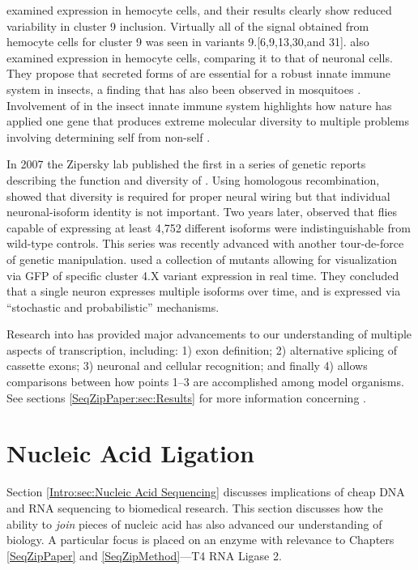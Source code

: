     \citep{Neves2004} examined \dscam{} expression in hemocyte cells, and their results clearly show reduced variability in cluster 9 inclusion. Virtually all of the signal obtained from hemocyte cells for cluster 9 was seen in variants 9.[6,9,13,30,and 31]. \citep{Watson2005} also examined \dscam{} expression in hemocyte cells, comparing it to that of neuronal cells. They propose that secreted forms of \dscam{} are essential for a robust innate immune system in insects, a finding that has also been observed in mosquitoes \citep{Dong2006}. Involvement of \dscam{} in the insect innate immune system highlights how nature has applied one gene that produces extreme molecular diversity to multiple problems involving determining self from non-self \citep{Hemani2012,Shi2012a, Hattori2008}.

    In 2007 the Zipersky lab published \citep{Hattori2007} the first in a series of genetic reports describing the function and diversity of \dscam{}. Using homologous recombination, \citet{Hattori2007} showed that \dscam{} diversity is required for proper neural wiring but that individual neuronal-isoform identity is not important. Two years later, \citet{Hattori2009} observed that flies capable of expressing at least 4,752 different \dscam{} isoforms were indistinguishable from wild-type controls. This series was recently advanced with another tour-de-force of genetic manipulation. \citet{Miura2013b} used a collection of \dscam{} mutants allowing for visualization via GFP of specific cluster 4.X variant expression in real time. They concluded that a single neuron expresses multiple \dscam{} isoforms over time, and \dscam{} is expressed via ``stochastic and probabilistic'' mechanisms.

    Research into \flies{} \dscam{} has provided major advancements to our understanding of multiple aspects of transcription, including: 1) exon definition; 2) alternative splicing of cassette exons; 3) neuronal and cellular recognition; and finally 4) allows comparisons between how points 1--3 are accomplished among model organisms. See sections \ref{SeqZipPaper:sec:Results} for more information concerning \dscam{}.

\section{Nucleic Acid Ligation}
  \label{Intro:sec:Nucleic Acid Ligation}

  Section \ref{Intro:sec:Nucleic Acid Sequencing} discusses implications of cheap DNA and RNA sequencing to biomedical research. This section discusses how the ability to \textit{join} pieces of nucleic acid has also advanced our understanding of biology. A particular focus is placed on an enzyme with relevance to Chapters \ref{SeqZipPaper} and \ref{SeqZipMethod}---T4 RNA Ligase 2.

